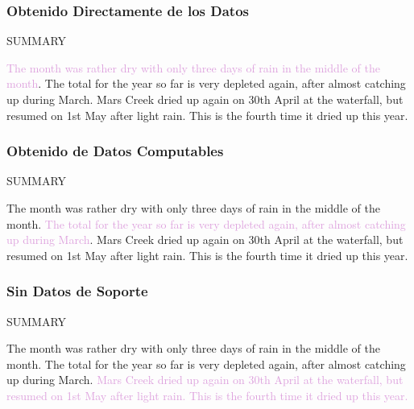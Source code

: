 \documentclass[compress,color=usenames]{beamer}
\newcommand{\mH}[1]{\textcolor{Plum}{#1}}
\begin{document}
\begin{frame}
\frametitle{Obtenido  Directamente de los Datos}

SUMMARY

\mH{The month was rather dry with only three days of rain in the middle of the month}. The total for the year so far is very depleted again, after almost catching up during March. Mars Creek dried up again on 30th April at the waterfall, but resumed on 1st May after light rain. This is the fourth time it dried up this year.

\end{frame}

\begin{frame}
\frametitle{Obtenido de Datos Computables}

SUMMARY

The month was rather dry with only three days of rain in the middle of the month. \mH{The total for the year so far is very depleted again, after almost catching up during March}. Mars Creek dried up again on 30th April at the waterfall, but resumed on 1st May after light rain. This is the fourth time it dried up this year.

\end{frame}

\begin{frame}
\frametitle{Sin Datos de Soporte}

SUMMARY

The month was rather dry with only three days of rain in the middle of the month. The total for the year so far is very depleted again, after almost catching up during March. \mH{Mars Creek dried up again on 30th April at the waterfall, but resumed on 1st May after light rain. This is the fourth time it dried up this year.}

\end{frame}
\end{document}
